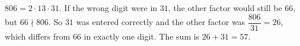 $806=2\cdot13\cdot31$. If the wrong digit were in $31$, the other factor would still be $66$, but $66\nmid806$. So $31$ was entered correctly and the other factor was $\dfrac{806}{31}=26$, which differs from $66$ in exactly one digit. The sum is $26+31=\boxed{57}$.
